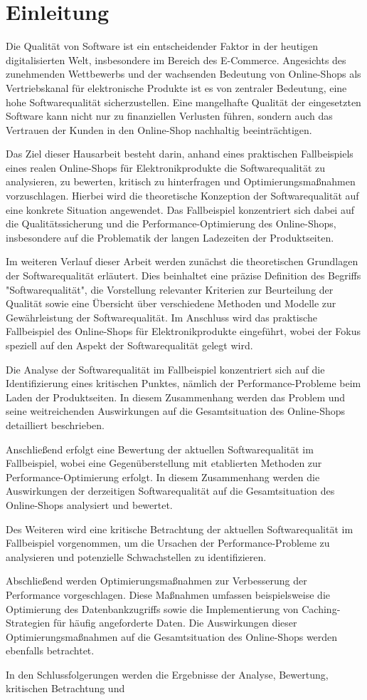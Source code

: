 \section{Einleitung}
Die Qualität von Software ist ein entscheidender Faktor in der heutigen digitalisierten Welt, insbesondere im Bereich des E-Commerce. Angesichts des zunehmenden Wettbewerbs und der wachsenden Bedeutung von Online-Shops als Vertriebskanal für elektronische Produkte ist es von zentraler Bedeutung, eine hohe Softwarequalität sicherzustellen. Eine mangelhafte Qualität der eingesetzten Software kann nicht nur zu finanziellen Verlusten führen, sondern auch das Vertrauen der Kunden in den Online-Shop nachhaltig beeinträchtigen.

Das Ziel dieser Hausarbeit besteht darin, anhand eines praktischen Fallbeispiels eines realen Online-Shops für Elektronikprodukte die Softwarequalität zu analysieren, zu bewerten, kritisch zu hinterfragen und Optimierungsmaßnahmen vorzuschlagen. Hierbei wird die theoretische Konzeption der Softwarequalität auf eine konkrete Situation angewendet. Das Fallbeispiel konzentriert sich dabei auf die Qualitätssicherung und die Performance-Optimierung des Online-Shops, insbesondere auf die Problematik der langen Ladezeiten der Produktseiten.

Im weiteren Verlauf dieser Arbeit werden zunächst die theoretischen Grundlagen der Softwarequalität erläutert. Dies beinhaltet eine präzise Definition des Begriffs "Softwarequalität", die Vorstellung relevanter Kriterien zur Beurteilung der Qualität sowie eine Übersicht über verschiedene Methoden und Modelle zur Gewährleistung der Softwarequalität. Im Anschluss wird das praktische Fallbeispiel des Online-Shops für Elektronikprodukte eingeführt, wobei der Fokus speziell auf den Aspekt der Softwarequalität gelegt wird.

Die Analyse der Softwarequalität im Fallbeispiel konzentriert sich auf die Identifizierung eines kritischen Punktes, nämlich der Performance-Probleme beim Laden der Produktseiten. In diesem Zusammenhang werden das Problem und seine weitreichenden Auswirkungen auf die Gesamtsituation des Online-Shops detailliert beschrieben.

Anschließend erfolgt eine Bewertung der aktuellen Softwarequalität im Fallbeispiel, wobei eine Gegenüberstellung mit etablierten Methoden zur Performance-Optimierung erfolgt. In diesem Zusammenhang werden die Auswirkungen der derzeitigen Softwarequalität auf die Gesamtsituation des Online-Shops analysiert und bewertet.

Des Weiteren wird eine kritische Betrachtung der aktuellen Softwarequalität im Fallbeispiel vorgenommen, um die Ursachen der Performance-Probleme zu analysieren und potenzielle Schwachstellen zu identifizieren.

Abschließend werden Optimierungsmaßnahmen zur Verbesserung der Performance vorgeschlagen. Diese Maßnahmen umfassen beispielsweise die Optimierung des Datenbankzugriffs sowie die Implementierung von Caching-Strategien für häufig angeforderte Daten. Die Auswirkungen dieser Optimierungsmaßnahmen auf die Gesamtsituation des Online-Shops werden ebenfalls betrachtet.

In den Schlussfolgerungen werden die Ergebnisse der Analyse, Bewertung, kritischen Betrachtung und
